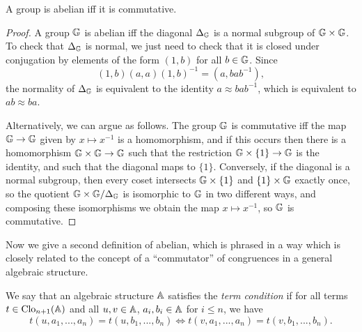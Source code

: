 \documentclass[letterpaper,11pt]{article}
\DeclareMathOperator{\Clo}{Clo}
\begin{document}
\begin{prop} A group is abelian iff it is commutative.
\end{prop}
\begin{proof} A group $\mathbb{G}$ is abelian iff the diagonal $\Delta_{\mathbb{G}}$ is a normal subgroup of $\mathbb{G}\times \mathbb{G}$. To check that $\Delta_{\mathbb{G}}$ is normal, we just need to check that it is closed under conjugation by elements of the form $(1,b)$ for all $b \in \mathbb{G}$. Since
\[
(1,b)(a,a)(1,b)^{-1} = (a,bab^{-1}),
\]
the normality of $\Delta_{\mathbb{G}}$ is equivalent to the identity $a \approx bab^{-1}$, which is equivalent to $ab \approx ba$.

Alternatively, we can argue as follows. The group $\mathbb{G}$ is commutative iff the map $\mathbb{G} \rightarrow \mathbb{G}$ given by $x \mapsto x^{-1}$ is a homomorphism, and if this occurs then there is a homomorphism $\mathbb{G} \times \mathbb{G} \rightarrow \mathbb{G}$ such that the restriction $\mathbb{G}\times \{1\} \rightarrow \mathbb{G}$ is the identity, and such that the diagonal maps to $\{1\}$. Conversely, if the diagonal is a normal subgroup, then every coset intersects $\mathbb{G}\times \{1\}$ and $\{1\}\times \mathbb{G}$ exactly once, so the quotient $\mathbb{G}\times \mathbb{G}/\Delta_{\mathbb{G}}$ is isomorphic to $\mathbb{G}$ in two different ways, and composing these isomorphisms we obtain the map $x \mapsto x^{-1}$, so $\mathbb{G}$ is commutative.
\end{proof}

Now we give a second definition of abelian, which is phrased in a way which is closely related to the concept of a ``commutator'' of congruences in a general algebraic structure.

\begin{defn} We say that an algebraic structure $\mathbb{A}$ satisfies the \emph{term condition} if for all terms $t \in \Clo_{n+1}(\bA)$ and all $u,v \in \mathbb{A}$, $a_i,b_i \in \mathbb{A}$ for $i \le n$, we have
\[
t(u,a_1, ..., a_n) = t(u,b_1, ..., b_n) \iff t(v,a_1, ..., a_n) = t(v,b_1, ..., b_n).
\]
\end{defn}
\end{document}
